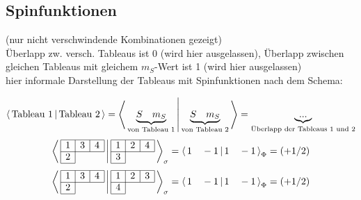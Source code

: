 \documentclass[fleqn]{article}%
\begin{document}
\subsection{Spinfunktionen}%
\label{subsec:Spinfunktionen}%
(nur nicht verschwindende Kombinationen gezeigt)\\ Überlapp zw. versch. Tableaus ist 0 (wird hier ausgelassen), Überlapp zwischen gleichen Tableaus mit gleichem $m_S$-Wert ist 1 (wird hier ausgelassen)\\hier informale Darstellung der Tableaus mit Spinfunktionen nach dem Schema: 

%
\begin{dmath*}\bra{\,\text{Tableau 1}\,}\ket{\,\text{Tableau 2}\,} = \bra{\, \underbrace{S \quad m_S}_{\text{von Tableau 1}} \,} \ket{\, \underbrace{S \quad m_S}_{\text{von Tableau 2}} \,} = \underbrace{...}_{\text{Überlapp der Tableaus 1 und 2}}\end{dmath*}%
\vspace{0.25cm}%
\vspace{0.25cm}%
\vspace{0.25cm}%
\begin{dmath*}\bra{\,\begin{array}{|c|c|c|} \hline 1 & 3 & 4\\ \cline{1-3} 2\\ \cline{1-1} \end{array} \,} \ket{\,\begin{array}{|c|c|c|} \hline 1 & 2 & 4\\ \cline{1-3} 3\\ \cline{1-1} \end{array} \,}_{\sigma }=\bra{\, 1\quad -1 \,} \ket{\, 1\quad -1 \,}_{\Phi} = \left( + 1/2\right) \end{dmath*}%
\vspace{0.25cm}%
\begin{dmath*}\bra{\,\begin{array}{|c|c|c|} \hline 1 & 3 & 4\\ \cline{1-3} 2\\ \cline{1-1} \end{array} \,} \ket{\,\begin{array}{|c|c|c|} \hline 1 & 2 & 3\\ \cline{1-3} 4\\ \cline{1-1} \end{array} \,}_{\sigma }=\bra{\, 1\quad -1 \,} \ket{\, 1\quad -1 \,}_{\Phi} = \left( + 1/2\right) \end{dmath*}%
\vspace{0.25cm}%
\end{document}
